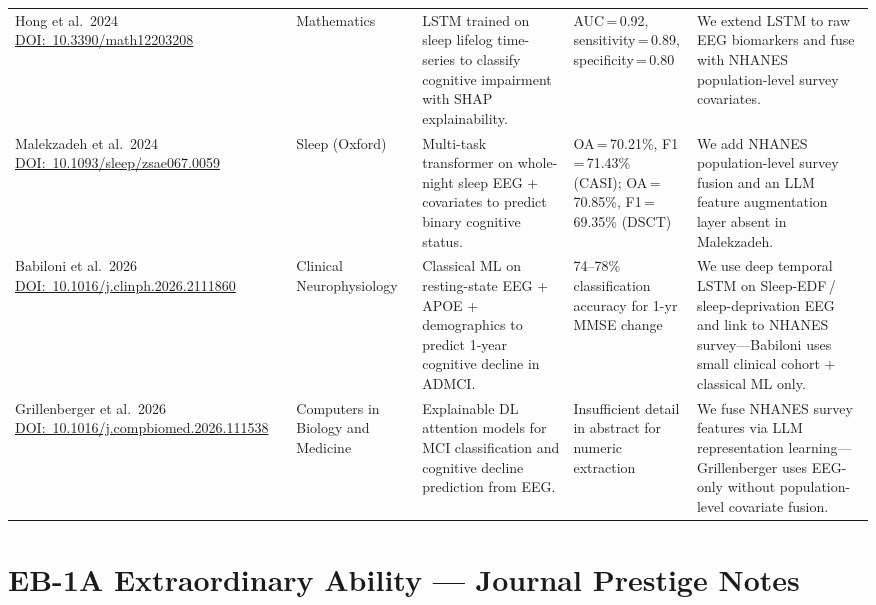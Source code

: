 \documentclass[a4paper,11pt]{article}
\begin{document}
\begin{longtable}{L{2.65cm}L{2.05cm}L{3.35cm}L{2.45cm}L{3.75cm}}
  \\[4pt]
  Hong et al.\ 2024\newline
  {\footnotesize\href{https://doi.org/10.3390/math12203208}%
    {DOI:~10.3390/math12203208}}
  &
  Mathematics
  &
  LSTM trained on sleep lifelog time-series to classify cognitive impairment with SHAP
  explainability.
  &
  AUC\,=\,0.92, sensitivity\,=\,0.89, specificity\,=\,0.80
  &
  We extend LSTM to raw EEG biomarkers and fuse with NHANES population-level survey
  covariates.
  \\[4pt]
  Malekzadeh et al.\ 2024\newline
  {\footnotesize\href{https://doi.org/10.1093/sleep/zsae067.0059}%
    {DOI:~10.1093/sleep/zsae067.0059}}
  &
  Sleep (Oxford)
  &
  Multi-task transformer on whole-night sleep EEG + covariates to predict binary
  cognitive status.
  &
  OA\,=\,70.21\%, F1\,=\,71.43\% (CASI); OA\,=\,70.85\%, F1\,=\,69.35\% (DSCT)
  &
  We add NHANES population-level survey fusion and an LLM feature augmentation layer
  absent in Malekzadeh.
  \\[4pt]
  Babiloni et al.\ 2026\newline
  {\footnotesize\href{https://doi.org/10.1016/j.clinph.2026.2111860}%
    {DOI:~10.1016/j.clinph.2026.2111860}}
  &
  Clinical Neurophysiology
  &
  Classical ML on resting-state EEG + APOE + demographics to predict 1-year cognitive
  decline in ADMCI.
  &
  74--78\% classification accuracy for 1-yr MMSE change
  &
  We use deep temporal LSTM on Sleep-EDF\,/\,sleep-deprivation EEG and link to NHANES
  survey---Babiloni uses small clinical cohort + classical ML only.
  \\[4pt]
  Grillenberger et al.\ 2026\newline
  {\footnotesize\href{https://doi.org/10.1016/j.compbiomed.2026.111538}%
    {DOI:~10.1016/j.compbiomed.2026.111538}}
  &
  Computers in Biology and Medicine
  &
  Explainable DL attention models for MCI classification and cognitive decline
  prediction from EEG.
  &
  Insufficient detail in abstract for numeric extraction
  &
  We fuse NHANES survey features via LLM representation learning---Grillenberger uses
  EEG-only without population-level covariate fusion.
  \\
\end{longtable}

\section{EB-1A Extraordinary Ability --- Journal Prestige Notes}
\end{document}
